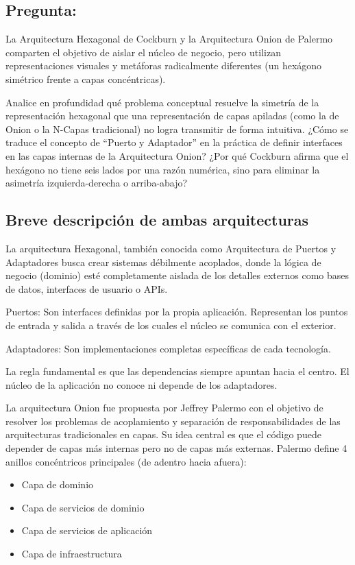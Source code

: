 \documentclass[12pt, a4paper]{article}
\begin{document}
        \subsection{Pregunta:}
        La Arquitectura Hexagonal de Cockburn y la Arquitectura Onion de Palermo comparten el objetivo de aislar el núcleo de negocio, pero utilizan representaciones visuales y metáforas radicalmente diferentes (un hexágono simétrico frente a capas concéntricas).

        Analice en profundidad qué problema conceptual resuelve la simetría de la representación hexagonal que una representación de capas apiladas (como la de Onion o la N-Capas tradicional) no logra transmitir de forma intuitiva. ¿Cómo se traduce el concepto de ``Puerto y Adaptador'' en la práctica de definir interfaces en las capas internas de la Arquitectura Onion? ¿Por qué Cockburn afirma que el hexágono no tiene seis lados por una razón numérica, sino para eliminar la asimetría izquierda-derecha o arriba-abajo?

        \subsection{Breve descripción de ambas arquitecturas}
        La arquitectura Hexagonal, también conocida como Arquitectura de Puertos y Adaptadores busca crear sistemas débilmente acoplados, donde la lógica de negocio (dominio) esté completamente aislada de los detalles externos como bases de datos, interfaces de usuario o APIs.
        
        Puertos: Son interfaces definidas por la propia aplicación. Representan los puntos de entrada y salida a través de los cuales el núcleo se comunica con el exterior.
        
        Adaptadores: Son implementaciones completas específicas de cada tecnología.
        
        La regla fundamental es que las dependencias siempre apuntan hacia el centro. El núcleo de la aplicación no conoce ni depende de los adaptadores.

        La arquitectura Onion fue propuesta por Jeffrey Palermo con el objetivo de resolver los problemas de acoplamiento y separación de responsabilidades de las arquitecturas tradicionales en capas. Su idea central es que el código puede depender de capas más internas pero no de capas más externas. Palermo define 4 anillos concéntricos principales (de adentro hacia afuera):
        \begin{itemize}
            \item Capa de dominio
            \item Capa de servicios de dominio
            \item Capa de servicios de aplicación
            \item Capa de infraestructura
        \end{itemize}
\end{document}
